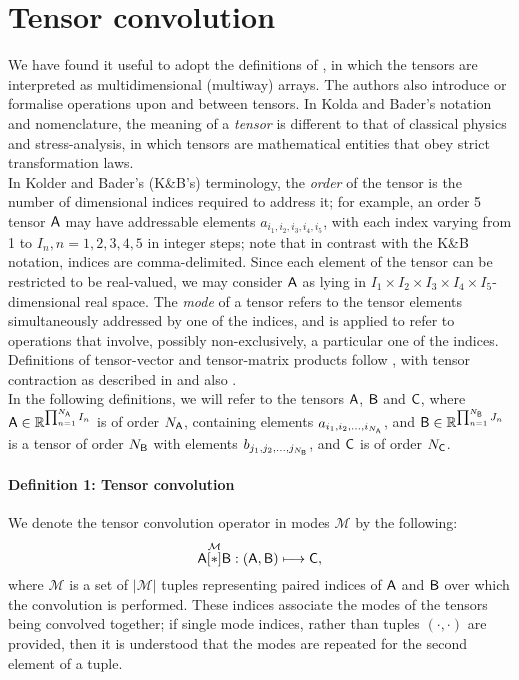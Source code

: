 \section{Tensor convolution}
\label{sec:AppTensorConv}
We have found it useful to adopt the definitions of \citep{kolda2009tensor}, in which the tensors are interpreted as multidimensional (multiway) arrays. The authors also introduce or formalise  operations upon and between tensors.  In Kolda and Bader's notation and nomenclature, the meaning of a {\em tensor} is different to that of classical physics and stress-analysis, in which tensors are mathematical entities that obey strict transformation laws.\\

In Kolder and Bader's (K\&B's) terminology, the {\it order} of the tensor is the number of dimensional indices required to address it; for example, an order 5 tensor $\mathsf{A}$ may have addressable elements $a_{i_1,i_2,i_3,i_4,i_5}$, with each index varying from 1 to $I_n, n = 1,2,3,4,5$ in integer steps; note that in contrast with the K\&B notation, indices are comma-delimited.  Since each element of the tensor can be restricted to be real-valued, we may consider $\mathsf{A}$ as lying in $I_1\times I_2\times I_3 \times I_4 \times I_5$- dimensional real space. The {\it mode} of a tensor refers to the tensor elements simultaneously addressed by one of the indices, and is applied to refer to operations that involve, possibly non-exclusively, a particular one of the indices.  Definitions of tensor-vector and tensor-matrix products follow \cite{kolda2009tensor}, with tensor contraction as described in \citep{bader2006algorithm} and also \citep{aja2009tensors}.\\

In the following definitions, we will refer to the tensors $\mathsf{A}$, $\mathsf{B}$ and $\mathsf{C}$, where $\mathsf{A}\in\mathbb{R}^{\prod_{n=1}^{N_{\mathsf{A}}}I_n}$ is of order $N_{\mathsf{A}}$, containing elements $a_{i_1,i_2,...,i_{N_{\mathsf{A}}}}$, and $\mathsf{B}\in\mathbb{R}^{\prod_{n=1}^{N_{\mathsf{B}}}J_n}$ is a tensor of order $N_{\mathsf{B}}$ with elements $b_{j_1,j_2,...,j_{N_{\mathsf{B}}}}$, and $\mathsf{C}$ is of order $N_{\mathsf{C}}$.

\paragraph{Definition 1: Tensor convolution} We denote the tensor convolution operator in modes $\mathcal{M}$ by the following:
\begin{equation}
\mathsf{A} \overset{\mathcal{M}}{[ \ast ]} \mathsf{B}: \left (\mathsf{A},\mathsf{B}  \right ) \longmapsto \mathsf{C},
\end{equation} 
 where $\mathcal{M}$ is a set of $|\mathcal{M}|$ tuples representing paired indices of $\mathsf{A}$ and $\mathsf{B}$ over which the convolution is performed.   These indices associate the modes of the tensors being convolved together; if single mode indices, rather than tuples $(\cdot,\cdot)$ are provided, then it is understood that the modes are repeated for the second element of a tuple.\\

